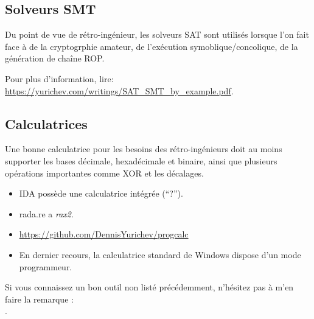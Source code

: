 \subsection{Solveurs SMT}

Du point de vue de rétro-ingénieur, les solveurs SAT sont utilisés lorsque l'on
fait face à de la cryptogrphie amateur, de l'exécution symoblique/concolique,
de la génération de chaîne ROP.

Pour plus d'information, lire: \url{https://yurichev.com/writings/SAT_SMT_by_example.pdf}.

\subsection{Calculatrices}

Une bonne calculatrice pour les besoins des rétro-ingénieurs doit au moins supporter
les bases décimale, hexadécimale et binaire, ainsi que plusieurs opérations importantes
comme XOR et les décalages.

\begin{itemize}

\item IDA possède une calculatrice intégrée (``?'').

\item rada.re a \emph{rax2}.

\item \url{https://github.com/DennisYurichev/progcalc}

\item En dernier recours, la calculatrice standard de Windows dispose d'un mode
programmeur.

\end{itemize}


Si vous connaissez un bon outil non listé précédemment, n'hésitez pas à m'en faire la remarque : \\
\TT{\EMAIL}.

